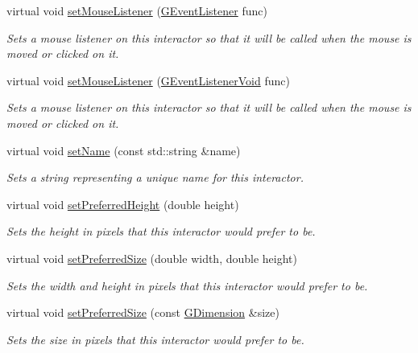 \begin{DoxyCompactItemize}
virtual void \mbox{\hyperlink{classsgl_1_1GInteractor_a37d8dbc943f59920f705b0104f60bde2}{set\+Mouse\+Listener}} (\mbox{\hyperlink{namespacesgl_ae9f3e9eab70035da1a2b114e21357b25}{G\+Event\+Listener}} func)
\begin{DoxyCompactList}\small\item\em Sets a mouse listener on this interactor so that it will be called when the mouse is moved or clicked on it. \end{DoxyCompactList}\item 
virtual void \mbox{\hyperlink{classsgl_1_1GInteractor_aea7f647ea62d59f71b5fad6aa65eeaf9}{set\+Mouse\+Listener}} (\mbox{\hyperlink{namespacesgl_a54427ce97bb1c2804e4fe2b0a62e8b17}{G\+Event\+Listener\+Void}} func)
\begin{DoxyCompactList}\small\item\em Sets a mouse listener on this interactor so that it will be called when the mouse is moved or clicked on it. \end{DoxyCompactList}\item 
virtual void \mbox{\hyperlink{classsgl_1_1GInteractor_a9d3a2685df23b5e7cbf59c19c4a1f9b5}{set\+Name}} (const std\+::string \&name)
\begin{DoxyCompactList}\small\item\em Sets a string representing a unique name for this interactor. \end{DoxyCompactList}\item 
virtual void \mbox{\hyperlink{classsgl_1_1GInteractor_a1ab987704fce32098706c6f00fb08218}{set\+Preferred\+Height}} (double height)
\begin{DoxyCompactList}\small\item\em Sets the height in pixels that this interactor would prefer to be. \end{DoxyCompactList}\item 
virtual void \mbox{\hyperlink{classsgl_1_1GInteractor_a042c5ae19430d765ef552371cae3632c}{set\+Preferred\+Size}} (double width, double height)
\begin{DoxyCompactList}\small\item\em Sets the width and height in pixels that this interactor would prefer to be. \end{DoxyCompactList}\item 
virtual void \mbox{\hyperlink{classsgl_1_1GInteractor_aa22d9be4bc0e078bb0ea69b0fc9d7c75}{set\+Preferred\+Size}} (const \mbox{\hyperlink{structsgl_1_1GDimension}{G\+Dimension}} \&size)
\begin{DoxyCompactList}\small\item\em Sets the size in pixels that this interactor would prefer to be. \end{DoxyCompactList}\item 

\end{DoxyCompactItemize}

